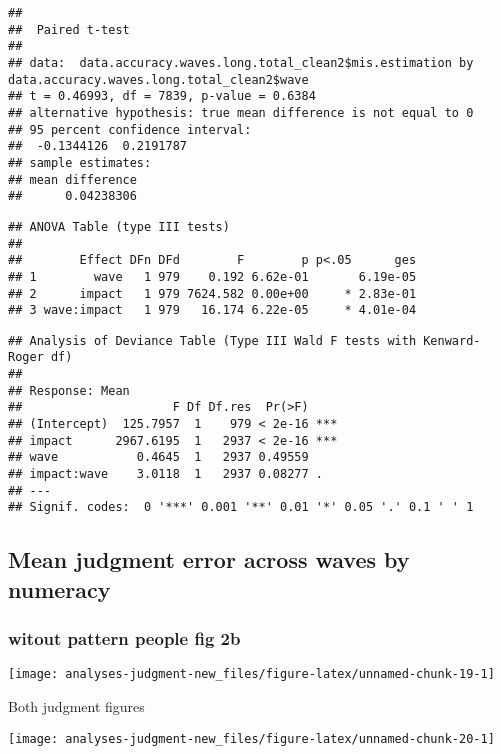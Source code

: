 \documentclass[
]{article}
\begin{document}
\begin{verbatim}
## 
##  Paired t-test
## 
## data:  data.accuracy.waves.long.total_clean2$mis.estimation by data.accuracy.waves.long.total_clean2$wave
## t = 0.46993, df = 7839, p-value = 0.6384
## alternative hypothesis: true mean difference is not equal to 0
## 95 percent confidence interval:
##  -0.1344126  0.2191787
## sample estimates:
## mean difference 
##      0.04238306
\end{verbatim}

\begin{verbatim}
## ANOVA Table (type III tests)
## 
##        Effect DFn DFd        F        p p<.05      ges
## 1        wave   1 979    0.192 6.62e-01       6.19e-05
## 2      impact   1 979 7624.582 0.00e+00     * 2.83e-01
## 3 wave:impact   1 979   16.174 6.22e-05     * 4.01e-04
\end{verbatim}

\begin{verbatim}
## Analysis of Deviance Table (Type III Wald F tests with Kenward-Roger df)
## 
## Response: Mean
##                     F Df Df.res  Pr(>F)    
## (Intercept)  125.7957  1    979 < 2e-16 ***
## impact      2967.6195  1   2937 < 2e-16 ***
## wave           0.4645  1   2937 0.49559    
## impact:wave    3.0118  1   2937 0.08277 .  
## ---
## Signif. codes:  0 '***' 0.001 '**' 0.01 '*' 0.05 '.' 0.1 ' ' 1
\end{verbatim}

\hypertarget{mean-judgment-error-across-waves-by-numeracy}{%
\subsection{Mean judgment error across waves by
numeracy}\label{mean-judgment-error-across-waves-by-numeracy}}

\hypertarget{witout-pattern-people-fig-2b}{%
\subsubsection{witout pattern people fig
2b}\label{witout-pattern-people-fig-2b}}

\begin{center}\texttt{[image: analyses-judgment-new\_files/figure-latex/unnamed-chunk-19-1]} \end{center}

Both judgment figures

\begin{center}\texttt{[image: analyses-judgment-new\_files/figure-latex/unnamed-chunk-20-1]} \end{center}
\end{document}
